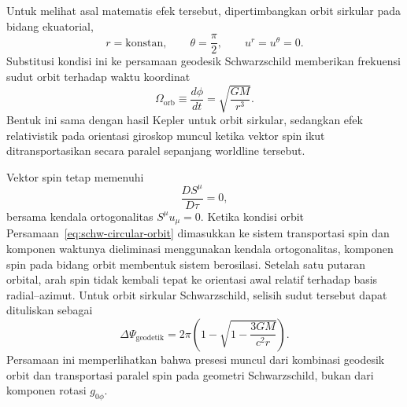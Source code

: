 Untuk melihat asal matematis efek tersebut, dipertimbangkan orbit sirkular
pada bidang ekuatorial,
\begin{equation}
    r=\text{konstan},
    \qquad
    \theta=\frac{\pi}{2},
    \qquad
    u^r=u^\theta=0.
    \label{eq:schw-circular-orbit}
\end{equation}
Substitusi kondisi ini ke persamaan geodesik Schwarzschild memberikan
frekuensi sudut orbit terhadap waktu koordinat
\begin{equation}
    \Omega_{\mathrm{orb}}
    \equiv\frac{d\phi}{dt}
    =\sqrt{\frac{GM}{r^3}}.
    \label{eq:omega-orbit-schwarzschild}
\end{equation}
Bentuk ini sama dengan hasil Kepler untuk orbit sirkular, sedangkan efek
relativistik pada orientasi giroskop muncul ketika vektor spin ikut
ditransportasikan secara paralel sepanjang worldline tersebut.

Vektor spin tetap memenuhi
\begin{equation}
    \frac{DS^\mu}{D\tau}=0,
\end{equation}
bersama kendala ortogonalitas $S^\mu u_\mu=0$. Ketika kondisi orbit
Persamaan~\eqref{eq:schw-circular-orbit} dimasukkan ke sistem transportasi
spin dan komponen waktunya dieliminasi menggunakan kendala ortogonalitas,
komponen spin pada bidang orbit membentuk sistem berosilasi. Setelah satu
putaran orbital, arah spin tidak kembali tepat ke orientasi awal relatif
terhadap basis radial--azimut. Untuk orbit sirkular Schwarzschild,
selisih sudut tersebut dapat dituliskan sebagai
\parencite{Schutz2009FirstCourse,Carroll2004SpacetimeGeometry}
\begin{equation}
    \Delta\Psi_{\mathrm{geodetik}}
    =2\pi\left(
        1-\sqrt{1-\frac{3GM}{c^2r}}
    \right).
    \label{eq:geodetic-exact-angle}
\end{equation}
Persamaan ini memperlihatkan bahwa presesi muncul dari kombinasi geodesik
orbit dan transportasi paralel spin pada geometri Schwarzschild, bukan dari
komponen rotasi $g_{0\phi}$.


